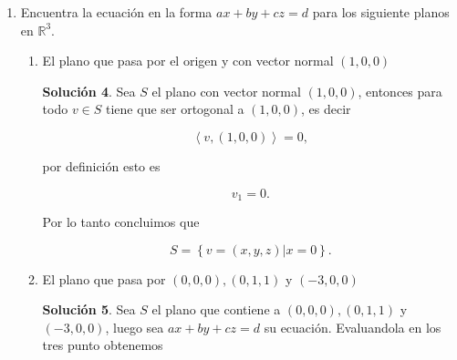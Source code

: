 \documentclass[letterpaper]{article}
\theoremstyle{definition}
\theoremstyle{lemathm}
\theoremstyle{lemathm}
\newtheorem{sol}{Solución}
\theoremstyle{lemathm}
\theoremstyle{lemademthm}
\newcommand{\pars}[1]{\left( #1 \right) }
\newcommand{\inprod}[1]{\left\langle #1 \right\rangle }
\newcommand{\norm}[1]{\left\lVert#1\right\rVert}
\newcommand{\set}[1]{\left \{ #1 \right\} }
\newcommand{\RR}{\mathbb{R}}
\newcommand{\1}{\mathbbm{1}}
\begin{document}
\begin{enumerate}
\begin{enumerate}
			\[C = \pars{1-h,1,2}, D = \pars{1+h,1,2}\]

			\item Expresa la distancia entre $A$ y $B$ en terminos de $h$
			
			\begin{sol}
				Por la distancia inducida por la norma obtenemos

				\[d\pars{A,B} = \norm{B-A} = 2h\]
			\end{sol}

			\item Expresa la distnacia entre $A$ y $D$ en terminos de $h$
			
			\begin{sol}
				Por la distancia inducida por la norma obtenemos

				\[d\pars{A,D} = \norm{D-A} = \norm{\pars{h-1,h,1}} = \sqrt{\pars{2}\pars{h^2-h+1}}\]
			\end{sol}

			\begin{sol}
				Por los dos incisos anteriores obtenemos la ecuación

				\[2h = \sqrt{\pars{2}\pars{h^2-h+1}},\]
				
				donde obtenemos

				\[h = \frac{\sqrt{5}}{2}-\frac{1}{2}.\]
			\end{sol}




		\end{enumerate}

		\item Encuentra la ecuación en la forma $ax+by+cz=d$ para los siguiente planos en $\RR^3$.
		\begin{enumerate}
			\item El plano que pasa por el origen y con vector normal $(1,0,0)$
			\begin{sol}
				Sea $S$ el plano con vector normal $(1,0,0)$, entonces para todo $v\in S$ tiene que ser ortogonal a $(1,0,0)$, es decir
				
				\[\inprod{v,(1,0,0)}=0,\]

				por definición esto es

				\[v_1=0.\]

				Por lo tanto concluimos que

				\[S = \set{v=\pars{x,y,z} | x = 0}.\]
			\end{sol}
			\item El plano que pasa por $\pars{0,0,0}, \pars{0,1,1}$ y $\pars{-3,0,0}$
			\begin{sol}
				Sea $S$ el plano que contiene a $\pars{0,0,0}, \pars{0,1,1}$ y $\pars{-3,0,0}$, luego sea $ax+by+cz = d$ su ecuación. Evaluandola en los tres punto obtenemos


\end{sol}
\end{enumerate}
\end{enumerate}
\end{document}

